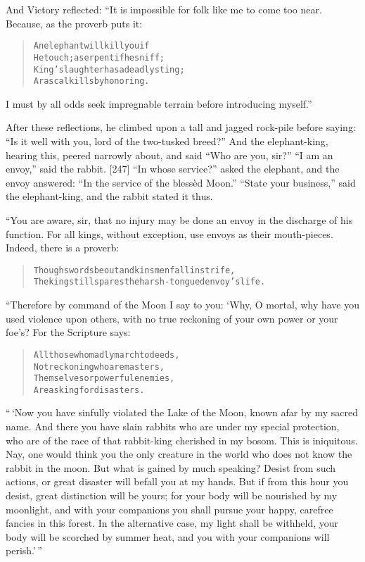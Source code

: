 \documentclass[article, twoside, 14pt]{memoir}
\renewenvironment{verbatim}{%
\begin{quote}%
\vskip -10pt%
\begin{alltt}\normalfont\large}{\end{alltt}%
\end{quote}%
\vskip -10pt
} %
\begin{document}
And Victory reflected: “It is impossible for folk like me to come
too near. Because, as the proverb puts it:

\begin{verbatim}
An elephant will kill you if
He touch; a serpent if he sniff;
King's laughter has a deadly sting;
A rascal kills by honoring.
\end{verbatim}
I must by all odds seek impregnable terrain before introducing
myself.”

After these reflections, he climbed upon a tall and jagged
rock-pile before saying:
``Is it well with you, lord of the two-tusked breed?'' And the
elephant-king, hearing this, peered narrowly about, and said
``Who are you, sir?'' ``I am an envoy,'' said the rabbit. [247]
``In whose service?'' asked the elephant, and the envoy answered:
``In the service of the blessèd Moon.'' ``State your business,''
said the elephant-king, and the rabbit stated it thus.

“You are aware, sir, that no injury may be done an envoy in the
discharge of his function. For all kings, without exception, use
envoys as their mouth-pieces. Indeed, there is a proverb:

\begin{verbatim}
Though swords be out and kinsmen fall in strife,
The king still spares the harsh-tongued envoy's life.
\end{verbatim}
“Therefore by command of the Moon I say to you: ‘Why, O mortal, why
have you used violence upon others, with no true reckoning of your
own power or your foe's? For the Scripture says:

\begin{verbatim}
All those who madly march to deeds,
Not reckoning who are masters,
Themselves or powerful enemies,
Are asking for disasters.
\end{verbatim}
``\,`Now you have sinfully violated the Lake of the Moon, known afar by my sacred name. And there you have slain rabbits who are under my special protection, who are of the race of that rabbit-king cherished in my bosom. This is iniquitous. Nay, one would think you the only creature in the world who does not know the rabbit in the moon. But what is gained by much speaking? Desist from such actions, or great disaster will befall you at my hands. But if from this hour you desist, great distinction will be yours; for your body will be nourished by my moonlight, and with your companions you shall pursue your happy, carefree fancies in this forest. In the alternative case, my light shall be withheld, your body will be scorched by summer heat, and you with your companions will perish.'\,''
\end{document}
